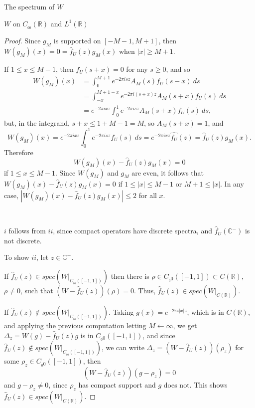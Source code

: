 \documentclass[12pt]{article}
\begin{document}
\begin{section}{The spectrum of $W$ }
\begin{subsection}{$W$ on $C_{_{0\!0}}(\mathbb{R})$ and $L^1(\mathbb{R})$}
\begin{proof}
Since $g_M$ is supported on $[-M-1,M+1]$, then $W(g_M)(x) = 0 = \hat{f}_U(z) g_M(x) $ when $|x| \ge M+1$.  

If $1 \le x \le M -1 $, then $f_U\!(  s + x ) = 0$ for any $s \ge 0$, and so
\begin{align*}
W(g_M)(x) &= \int_0^{M+1} e^{-2 \pi i s z} A_M(s) f_U\!(  s - x )  \ ds \\
 & = \int_{-x}^{M+1 - x} e^{-2 \pi i (s+x) z} A_M(s+x) f_U\!(  s  )  \ ds \\
 & = e^{-2 \pi i x z} \int_0^1 e^{-2 \pi i s z} A_M(s+x) f_U\!(  s  )  \ ds,
\end{align*}
but, in the integrand, $s+x \le 1 + M-1=M$, so $A_M(s+x)=1$, and
$$
W(g_M)(x) = e^{-2 \pi i x z} \int_0^1 e^{-2 \pi i s z} f_U\!(  s  )  \ ds 
= e^{-2 \pi i x z} \hat{f_U}(z) = \hat{f}_U(z) g_M(x).
$$
Therefore
$$
W(g_M)(x) - \hat{f}_U(z) g_M(x) = 0
$$
if $1 \le x \le M-1$. Since $W(g_M)$ and $g_M$ are even, it follows that $W(g_M)(x) - \hat{f}_U(z) g_M(x) = 0 $
if $1 \le |x| \le M-1$ or $M+1 \le |x|$. In any case, $|W(g_M)(x) - \hat{f}_U(z) g_M(x)| \le 2$ for all $x$.  

\  
\  


$i$ follows from $ii$, since compact operators have discrete spectra, and $\hat{f}_U(\mathbb{C}^-)$ is not discrete.

To show $ii$, let $z \in \mathbb{C}^-$.  

If $\hat{f}_U(z) \in spec\left(W\Big|_{C_{_{0\!0}}([-1,1])}   \right) $  then there is $\rho \in C_{_0\!0}([-1,1]) \subset C(\mathbb{R})$, $\rho \ne 0$, such that $(W - \hat{f}_U(z))(\rho) = 0$. Thus, $\hat{f}_U(z) \in spec\left(W\Big|_{C(\mathbb{R})}   \right) $. 

If $\hat{f}_U(z) \notin spec\left(W\Big|_{C_{_{0\!0}}([-1,1])}   \right) $. Taking $g(x) = e^{-2 \pi i |x| z}$, which is in $C(\mathbb{R})$, and applying the previous computation letting $M \leftarrow \infty$, we get $\Delta_z = W(g) - \hat{f}_U(z)g$ is in $C_{_0\!0}([-1,1])$, and since $\hat{f}_U(z) \notin spec\left(W\Big|_{C_{_{0\!0} }([-1,1])}   \right) $, we can write $\Delta_z = (W - \hat{f}_U(z))(\rho_z) $ for some $\rho_z \in C_{_0\!0}([-1,1])$, then
$$
(W - \hat{f}_U(z))(g - \rho_z) = 0
$$
and $g - \rho_z \ne 0$, since $\rho_z$ has compact support and $g$ does not. This shows $\hat{f}_U(z) \in spec\left(W\Big|_{C(\mathbb{R})}   \right) $.  


\end{proof}
\end{subsection}
\end{section}
\end{document}
